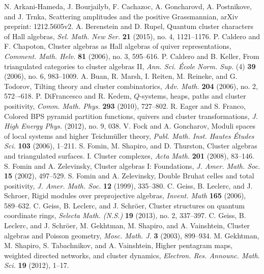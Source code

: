 \documentclass{amsart}
\theoremstyle{definition}
\theoremstyle{remark}
\numberwithin{equation}{section}
\begin{document}
\begin{thebibliography}{99}
   N. Arkani-Hameda, J. Bourjailyb, F. Cachazoc, A. Goncharovd, A. Postnikove, and J. Trnka, Scattering amplitudes and the positive Grassmannian, arXiv preprint: 1212.5605v2.
   A. Berenstein and D. Rupel, Quantum cluster characters of Hall algebras, \textsl{Sel. Math. New Ser.} \textbf{21} (2015), no. 4, 1121--1176.
   P. Caldero and F. Chapoton, Cluster algebras as Hall algebras of quiver representations, \textsl{Comment. Math. Helv.} \textbf{81} (2006), no. 3, 595--616.
   P. Caldero and B. Keller, From triangulated categories to cluster algebras II, \textsl{Ann. Sci. \'Ecole Norm. Sup.} (4) \textbf{39} (2006), no. 6, 983--1009.
   A. Buan, R. Marsh, I. Reiten, M. Reineke, and G. Todorov, Tilting theory and cluster combinatorics, \textsl{Adv. Math.} \textbf{204} (2006), no. 2, 572–-618.
	 P. DiFrancesco and R. Kedem, $Q$-systems, heaps, paths and cluster positivity, \textsl{Comm. Math. Phys.} \textbf{293} (2010), 727--802.
   R. Eager and S. Franco, Colored BPS pyramid partition functions, quivers and cluster transformations, \textsl{J. High Energy Phys.} (2012), no. 9, 038.
	 V. Fock and A. Goncharov, Moduli spaces of local systems and higher Teichmüller theory, \textsl{Publ. Math. Inst. Hautes Études Sci.} \textbf{103} (2006), 1--211.
	 S. Fomin, M. Shapiro, and D. Thurston, Cluster algebras and triangulated surfaces. I. Cluster complexes, \textsl{Acta Math.} \textbf{201} (2008), 83--146.
	 S. Fomin and A. Zelevinsky, Cluster algebras I: Foundations, \textsl{J. Amer. Math. Soc.} \textbf{15} (2002), 497--529.
	 S. Fomin and A. Zelevinsky, Double Bruhat celles and total positivity, \textsl{J. Amer. Math. Soc.} \textbf{12} (1999), 335--380.
	 C. Geiss, B. Leclerc, and J. Schroer, Rigid modules over preprojective algebras, \textsl{Invent. Math} \textbf{165} (2006), 589--632.
   C. Geiss, B. Leclerc, and J. Schr\"oer, Cluster structures on quantum coordinate rings, \textsl{Selecta Math. (N.S.)} \textbf{19} (2013), no. 2, 337--397.
   C. Geiss, B. Leclerc, and J. Schr\"oer,
	 M. Gekhtman, M. Shapiro, and A. Vainshtein,  Cluster algebras and Poisson geometry, \textsl{Mosc. Math. J.} \textbf{3} (2003), 899--934.
	 M. Gekhtman, M. Shapiro, S. Tabachnikov, and A. Vainshtein, Higher pentagram maps, weighted directed networks, and cluster dynamics, \textsl{Electron. Res. Announc. Math. Sci.} \textbf{19} (2012), 1--17.

\end{thebibliography}
\end{document}
